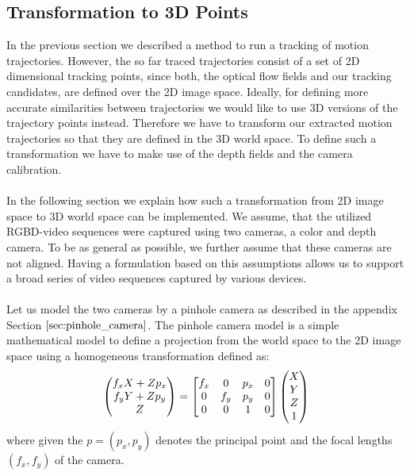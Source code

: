 \subsection{Transformation to 3D Points}
\label{subsection:transform_to_3d_points}
In the previous section we described a method to run a tracking of motion trajectories. However, the so far traced trajectories consist of a set of 2D dimensional tracking points, since both, the optical flow fields and our tracking candidates, are defined over the 2D image space. Ideally, for defining more accurate similarities between trajectories we would like to use 3D versions of the trajectory points instead. Therefore we have to transform our extracted motion trajectories so that they are defined in the 3D world space. To define such a transformation we have to make use of the depth fields and the camera calibration. \\ \\
In the following section we explain how such a transformation from 2D image space to 3D world space can be implemented. We assume, that the utilized RGBD-video sequences were captured using two cameras, a color and depth camera. To be as general as possible, we further assume that these cameras are not aligned. Having a formulation based on this assumptions allows us to support a broad series of video sequences captured by various devices. \\ \\
Let us model the two cameras by a pinhole camera as described in the appendix Section $\ref{sec:pinhole_camera}$. The pinhole camera model is a simple mathematical model to define a projection from the world space to the 2D image space using a homogeneous transformation defined as: 
\begin{equation}
\colvec[f_x X + Z p_x]{f_y Y + Z p_y}{Z} =
\begin{bmatrix}
f_x & 0 & p_x & 0 \\
0 & f_y & p_y & 0 \\
0 & 0 & 1 & 0
\end{bmatrix}
\begin{pmatrix}
X \\
Y \\
Z \\
1
\end{pmatrix}
\label{eq:homogen_camera_mat_transf}
\end{equation}
where given the  $p = \left(p_x, p_y \right)$ denotes the principal point and the focal lengths $\left(f_x, f_y \right)$ of the camera. \\ \\
